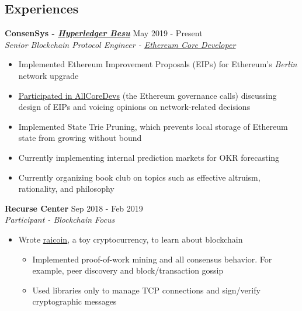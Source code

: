 \documentclass[overlapped]{res}
\begin{document}

\address{\href{rai.dev}{\underline{rai.dev}} \\ \href{https://www.github.com/ratanrsur}{\underline{github.com/ratanrsur}}}
\address{\href{mailto:ratan.r.sur@gmail.com}{\underline{ratan.r.sur@gmail.com}} \\ \hfill +1 646 410 6411\\\hfill{}US Citizen}
\begin{resume}


    \section{Experiences}

    {\bf ConsenSys - \href{https://www.github.com/Hyperledger/Besu}{\underline{\em Hyperledger Besu}}} \hfill May 2019 - Present \\
    {\em Senior Blockchain Protocol Engineer - \href{https://hudsonjameson.com/2020-06-22-what-is-an-ethereum-core-developer}{{\underline{Ethereum Core Developer\/}}}}
    \begin{itemize} \itemsep-2pt
        \item Implemented Ethereum Improvement Proposals (EIPs) for Ethereum's {\em Berlin} network upgrade
        \item
          \href{https://youtu.be/AclPXsRlgSc?t=56}{\underline{Participated in AllCoreDevs}} (the Ethereum governance calls) discussing design of EIPs and voicing opinions on network-related decisions
        \item
          Implemented State Trie Pruning, which prevents local storage of Ethereum state from growing without bound
        \item Currently implementing internal prediction markets for OKR forecasting
        \item Currently organizing book club on topics such as effective altruism, rationality, and philosophy
    \end{itemize}

    {\bf Recurse Center} \hfill Sep 2018 - Feb 2019 \\
    {\em Participant\/ - Blockchain Focus}
    \begin{itemize} \itemsep-2pt
        \item
          Wrote \href{https://www.github.com/ratanrsur/raicoin}{\underline{raicoin}}, a toy cryptocurrency, to learn about blockchain
        \begin{itemize} \itemsep-2pt
          \item
            Implemented proof-of-work mining and all consensus behavior. For example, peer discovery and block/transaction gossip
          \item Used libraries only to manage TCP connections and sign/verify cryptographic messages
        \end{itemize}


\end{itemize}
\end{resume}
\end{document}
